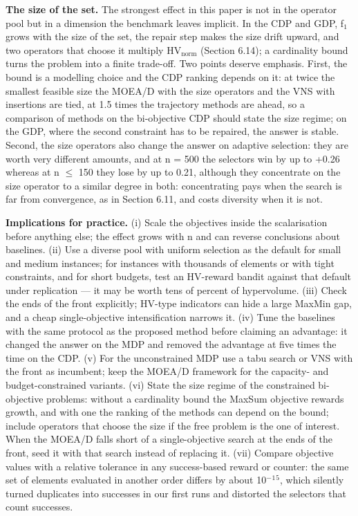 \textbf{The size of the set.} The strongest effect in this paper is not in the operator pool but in a dimension the benchmark leaves implicit. In the CDP and GDP, f$_{1}$ grows with the size of the set, the repair step makes the size drift upward, and two operators that choose it multiply $\mathrm{HV}_{\mathrm{norm}}$ (Section 6.14); a cardinality bound turns the problem into a finite trade-off. Two points deserve emphasis. First, the bound is a modelling choice and the CDP ranking depends on it: at twice the smallest feasible size the MOEA/D with the size operators and the VNS with insertions are tied, at 1.5 times the trajectory methods are ahead, so a comparison of methods on the bi-objective CDP should state the size regime; on the GDP, where the second constraint has to be repaired, the answer is stable. Second, the size operators also change the answer on adaptive selection: they are worth very different amounts, and at n = 500 the selectors win by up to +0.26 whereas at n $\leq$ 150 they lose by up to 0.21, although they concentrate on the size operator to a similar degree in both: concentrating pays when the search is far from convergence, as in Section 6.11, and costs diversity when it is not.

\textbf{Implications for practice.} (i) Scale the objectives inside the scalarisation before anything else; the effect grows with n and can reverse conclusions about baselines. (ii) Use a diverse pool with uniform selection as the default for small and medium instances; for instances with thousands of elements or with tight constraints, and for short budgets, test an HV-reward bandit against that default under replication --- it may be worth tens of percent of hypervolume. (iii) Check the ends of the front explicitly; HV-type indicators can hide a large MaxMin gap, and a cheap single-objective intensification narrows it. (iv) Tune the baselines with the same protocol as the proposed method before claiming an advantage: it changed the answer on the MDP and removed the advantage at five times the time on the CDP. (v) For the unconstrained MDP use a tabu search or VNS with the front as incumbent; keep the MOEA/D framework for the capacity- and budget-constrained variants. (vi) State the size regime of the constrained bi-objective problems: without a cardinality bound the MaxSum objective rewards growth, and with one the ranking of the methods can depend on the bound; include operators that choose the size if the free problem is the one of interest. When the MOEA/D falls short of a single-objective search at the ends of the front, seed it with that search instead of replacing it. (vii) Compare objective values with a relative tolerance in any success-based reward or counter: the same set of elements evaluated in another order differs by about 10$^{-}$$^{1}$$^{5}$, which silently turned duplicates into successes in our first runs and distorted the selectors that count successes.

